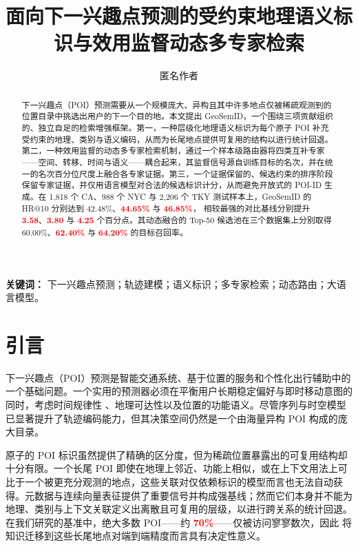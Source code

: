 \documentclass[10pt,fontset=none,twocolumn]{ctexart}
\title{\bfseries 面向下一兴趣点预测的受约束地理语义标识与效用监督动态多专家检索}
\author{匿名作者}
\date{}
\newcommand{\mock}[1]{\textbf{\textcolor{red}{#1}}}
\begin{document}
\maketitle

\begin{abstract}
下一兴趣点（POI）预测需要从一个规模庞大、异构且其中许多地点仅被稀疏观测到的位置目录中挑选出用户的下一个目的地。本文提出 GeoSemID，一个围绕三项贡献组织的、独立自足的检索增强框架。第一，一种层级化地理语义标识为每个原子 POI 补充受约束的地理、类别与语义编码，从而为长尾地点提供可复用的结构以进行统计回退。第二，一种效用监督的动态多专家检索机制，通过一个样本级路由器将四类互补专家——空间、转移、时间与语义——耦合起来，其监督信号源自训练目标的名次，并在统一的名次百分位尺度上融合各专家证据。第三，一个证据保留的、候选约束的排序阶段保留专家证据，并仅用语言模型对合法的候选标识计分，从而避免开放式的 POI-ID 生成。在 1{,}818 个 CA、988 个 NYC 与 2{,}206 个 TKY 测试样本上，GeoSemID 的 HR@10 分别达到 42.48\%、\mock{44.65\%} 与 \mock{46.85\%}，
相较最强的对比基线分别提升 \mock{3.58}、\mock{3.80} 与
\mock{4.25} 个百分点。其动态融合的 Top-50 候选池在三个数据集上分别取得 60.00\%、\mock{62.40\%} 与 \mock{64.20\%} 的目标召回率。
\end{abstract}

\noindent\textbf{关键词：} 下一兴趣点预测；轨迹建模；语义标识；多专家检索；动态路由；大语言模型。

\section{引言}
\label{sec:introduction}

下一兴趣点（POI）预测是智能交通系统、基于位置的服务和个性化出行辅助中的一个基础问题。一个实用的预测器必须在平衡用户长期稳定偏好与即时移动意图的同时，考虑时间规律性 \cite{gonzalez2008mobility}、地理可达性以及位置的功能语义。尽管序列与时空模型 \cite{cheng2013successive,feng2015prme,yang2020flashback} 已显著提升了轨迹编码能力，但其决策空间仍然是一个由海量异构 POI 构成的庞大目录。

原子的 POI 标识虽然提供了精确的区分度，但为稀疏位置暴露出的可复用结构却十分有限。一个长尾 POI 即使在地理上邻近、功能上相似，或在上下文用法上可比于一个被更充分观测的地点，这些关联对仅依赖标识的模型而言也无法自动获得。元数据与连续向量表征提供了重要信号并构成强基线；然而它们本身并不能为地理、类别与上下文关联定义出离散且可复用的层级，以进行跨关系的统计回退。在我们研究的基准中，绝大多数 POI——约 \mock{70\%}——仅被访问寥寥数次，因此
将知识迁移到这些长尾地点对端到端精度而言具有决定性意义。
\end{document}
